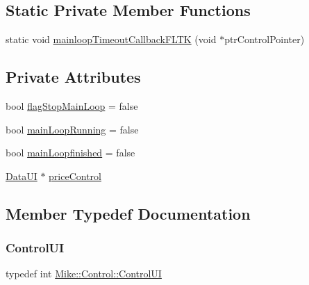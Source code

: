 \subsection*{Static Private Member Functions}
\begin{DoxyCompactItemize}
\item 
static void \hyperlink{class_mike_1_1_control_ac627d3cc73f39181fbfabfa01eb47f85}{mainloop\+Timeout\+Callback\+F\+L\+TK} (void $\ast$ptr\+Control\+Pointer)
\end{DoxyCompactItemize}
\subsection*{Private Attributes}
\begin{DoxyCompactItemize}
\item 
bool \hyperlink{class_mike_1_1_control_a800d1dc7b58dc3af7c081225009c898f}{flag\+Stop\+Main\+Loop} = false
\item 
bool \hyperlink{class_mike_1_1_control_af17a58f80bda54fda5b0a5167c8f04ed}{main\+Loop\+Running} = false
\item 
bool \hyperlink{class_mike_1_1_control_a7749b97976e1bb3e7ea49c7d63531dfc}{main\+Loopfinished} = false
\item 
\hyperlink{class_mike_1_1_control_addbe39ef40982f0a4002b6f74091a799}{Data\+UI} $\ast$ \hyperlink{class_mike_1_1_control_a61d38447360ba0baa9ac8a3607de0c5b}{price\+Control}
\end{DoxyCompactItemize}


\subsection{Member Typedef Documentation}
\mbox{\label{class_mike_1_1_control_a313ca882c409ba9bed4837acf6d17a72}} 
\subsubsection{\texorpdfstring{Control\+UI}{ControlUI}}
{\footnotesize\ttfamily typedef int \hyperlink{class_mike_1_1_control_a313ca882c409ba9bed4837acf6d17a72}{Mike\+::\+Control\+::\+Control\+UI}\hspace{0.3cm}{\ttfamily [private]}}

\mbox{\label{class_mike_1_1_control_addbe39ef40982f0a4002b6f74091a799}} 
